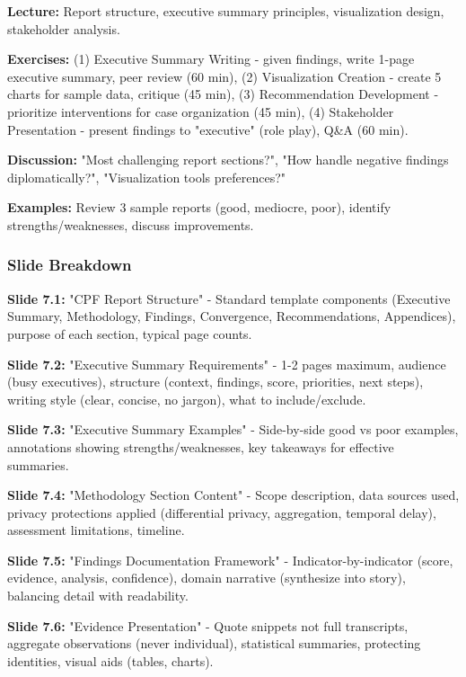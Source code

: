 \documentclass[11pt,a4paper]{article}
\begin{document}
\textbf{Lecture:} Report structure, executive summary principles, visualization design, stakeholder analysis.

\textbf{Exercises:} (1) Executive Summary Writing - given findings, write 1-page executive summary, peer review (60 min), (2) Visualization Creation - create 5 charts for sample data, critique (45 min), (3) Recommendation Development - prioritize interventions for case organization (45 min), (4) Stakeholder Presentation - present findings to "executive" (role play), Q\&A (60 min).

\textbf{Discussion:} "Most challenging report sections?", "How handle negative findings diplomatically?", "Visualization tools preferences?"

\textbf{Examples:} Review 3 sample reports (good, mediocre, poor), identify strengths/weaknesses, discuss improvements.

\subsubsection{Slide Breakdown}

\textbf{Slide 7.1:} "CPF Report Structure" - Standard template components (Executive Summary, Methodology, Findings, Convergence, Recommendations, Appendices), purpose of each section, typical page counts.

\textbf{Slide 7.2:} "Executive Summary Requirements" - 1-2 pages maximum, audience (busy executives), structure (context, findings, score, priorities, next steps), writing style (clear, concise, no jargon), what to include/exclude.

\textbf{Slide 7.3:} "Executive Summary Examples" - Side-by-side good vs poor examples, annotations showing strengths/weaknesses, key takeaways for effective summaries.

\textbf{Slide 7.4:} "Methodology Section Content" - Scope description, data sources used, privacy protections applied (differential privacy, aggregation, temporal delay), assessment limitations, timeline.

\textbf{Slide 7.5:} "Findings Documentation Framework" - Indicator-by-indicator (score, evidence, analysis, confidence), domain narrative (synthesize into story), balancing detail with readability.

\textbf{Slide 7.6:} "Evidence Presentation" - Quote snippets not full transcripts, aggregate observations (never individual), statistical summaries, protecting identities, visual aids (tables, charts).
\end{document}
